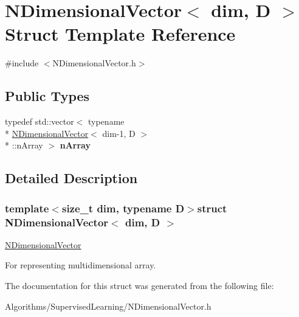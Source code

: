 \hypertarget{structNDimensionalVector}{\section{N\-Dimensional\-Vector$<$ dim, D $>$ Struct Template Reference}
\label{structNDimensionalVector}
}


{\ttfamily \#include $<$N\-Dimensional\-Vector.\-h$>$}

\subsection*{Public Types}
\begin{DoxyCompactItemize}
\item 
\hypertarget{structNDimensionalVector_ae933e15c6af2eaed20472909b7030090}{typedef std\-::vector$<$ typename \\*
\hyperlink{structNDimensionalVector}{N\-Dimensional\-Vector}$<$ dim-\/1, D $>$\\*
\-::n\-Array $>$ {\bfseries n\-Array}}\label{structNDimensionalVector_ae933e15c6af2eaed20472909b7030090}

\end{DoxyCompactItemize}


\subsection{Detailed Description}
\subsubsection*{template$<$size\-\_\-t dim, typename D$>$struct N\-Dimensional\-Vector$<$ dim, D $>$}

\hyperlink{structNDimensionalVector}{N\-Dimensional\-Vector}

For representing multidimensional array. 

The documentation for this struct was generated from the following file\-:\begin{DoxyCompactItemize}
\item 
Algorithms/\-Supervised\-Learning/N\-Dimensional\-Vector.\-h\end{DoxyCompactItemize}

